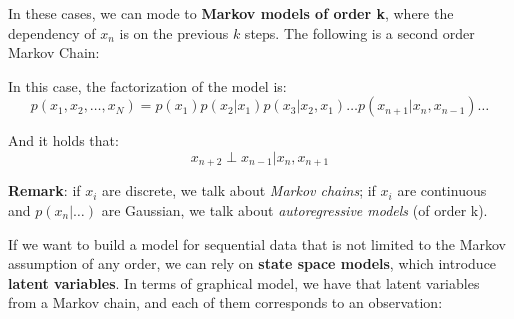 In these cases, we can mode to \textbf{Markov models of order k}, where the dependency of $x_n$ is on the previous $k$ steps. The following is a second order Markov Chain:
\vspace{0.5cm}
\begin{center}
\end{center}

In this case, the factorization of the model is:
$$
p(x_1, x_2, \dots, x_N) = p(x_1)p(x_2|x_1)p(x_3|x_2,x_1) \dots p(x_{n+1}|x_n, x_{n-1}) \dots
$$

And it holds that:
$$
x_{n+2} \perp x_{n-1} | x_n, x_{n+1}
$$

\textbf{Remark}: if $x_i$ are discrete, we talk about \textit{Markov chains}; if $x_i$ are continuous and $p(x_n|\dots)$ are Gaussian, we talk about \textit{autoregressive models} (of order k).

If we want to build a model for sequential data that is not limited to the Markov assumption of any order, we can rely on \textbf{state space models}, which introduce \textbf{latent variables}. In terms of graphical model, we have that latent variables from a Markov chain, and each of them corresponds to an observation:

